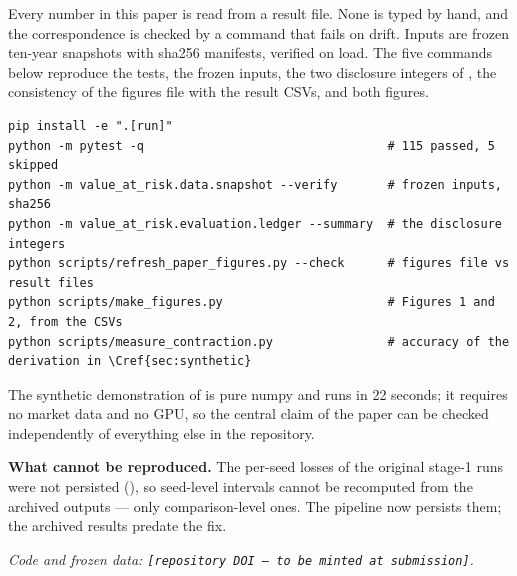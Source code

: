 Every number in this paper is read from a result file. None is typed by hand, and the
correspondence is checked by a command that fails on drift. Inputs are frozen ten-year snapshots
with sha256 manifests, verified on load. The five commands below reproduce the tests, the frozen
inputs, the two disclosure integers of , the consistency of the figures file with the result
CSVs, and both figures.

\begin{verbatim}
pip install -e ".[run]"
python -m pytest -q                                  # 115 passed, 5 skipped
python -m value_at_risk.data.snapshot --verify       # frozen inputs, sha256
python -m value_at_risk.evaluation.ledger --summary  # the disclosure integers
python scripts/refresh_paper_figures.py --check      # figures file vs result files
python scripts/make_figures.py                       # Figures 1 and 2, from the CSVs
python scripts/measure_contraction.py                # accuracy of the derivation in \Cref{sec:synthetic}
\end{verbatim}

The synthetic demonstration of  is pure numpy and runs in 22 seconds; it requires no market
data and no GPU, so the central claim of the paper can be checked independently of everything
else in the repository.

\textbf{What cannot be reproduced.} The per-seed losses of the original stage-1 runs were not
persisted (), so seed-level intervals cannot be recomputed from the archived outputs --- only
comparison-level ones. The pipeline now persists them; the archived results predate the fix.

\emph{Code and frozen data: \texttt{{[}repository\ DOI\ ---\ to\ be\ minted\ at\ submission{]}}.}
